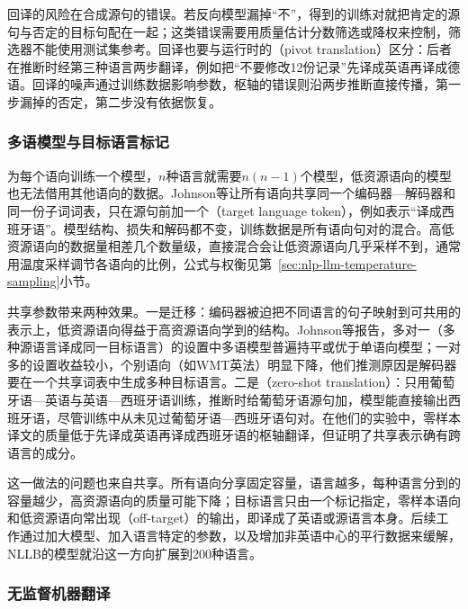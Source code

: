 回译的风险在合成源句的错误。若反向模型漏掉“不”，得到的训练对就把肯定的源句与否定的目标句配在一起；这类错误需要用质量估计分数筛选或降权来控制，筛选器不能使用测试集参考。回译也要与运行时的（pivot translation）区分：后者在推断时经第三种语言两步翻译，例如把“不要修改12份记录”先译成英语再译成德语。回译的噪声通过训练数据影响参数，枢轴的错误则沿两步推断直接传播，第一步漏掉的否定，第二步没有依据恢复。

\subsubsection{多语模型与目标语言标记}
\label{sec:nlp-generation-multilingual-mt}

为每个语向训练一个模型，$n$种语言就需要$n(n-1)$个模型，低资源语向的模型也无法借用其他语向的数据。Johnson等让所有语向共享同一个编码器—解码器和同一份子词词表，只在源句前加一个（target language token），例如表示“译成西班牙语”。模型结构、损失和解码都不变，训练数据是所有语向句对的混合。高低资源语向的数据量相差几个数量级，直接混合会让低资源语向几乎采样不到，通常用温度采样调节各语向的比例，公式与权衡见第~\ref{sec:nlp-llm-temperature-sampling}小节。

共享参数带来两种效果。一是迁移：编码器被迫把不同语言的句子映射到可共用的表示上，低资源语向得益于高资源语向学到的结构。Johnson等报告，多对一（多种源语言译成同一目标语言）的设置中多语模型普遍持平或优于单语向模型；一对多的设置收益较小，个别语向（如WMT英法）明显下降，他们推测原因是解码器要在一个共享词表中生成多种目标语言。二是（zero-shot translation）：只用葡萄牙语—英语与英语—西班牙语训练，推断时给葡萄牙语源句加，模型能直接输出西班牙语，尽管训练中从未见过葡萄牙语—西班牙语句对。在他们的实验中，零样本译文的质量低于先译成英语再译成西班牙语的枢轴翻译，但证明了共享表示确有跨语言的成分。

这一做法的问题也来自共享。所有语向分享固定容量，语言越多，每种语言分到的容量越少，高资源语向的质量可能下降；目标语言只由一个标记指定，零样本语向和低资源语向常出现（off-target）的输出，即译成了英语或源语言本身。后续工作通过加大模型、加入语言特定的参数，以及增加非英语中心的平行数据来缓解，NLLB的模型就沿这一方向扩展到200种语言。

\subsubsection{无监督机器翻译}
\label{sec:nlp-generation-unsupervised-mt}

